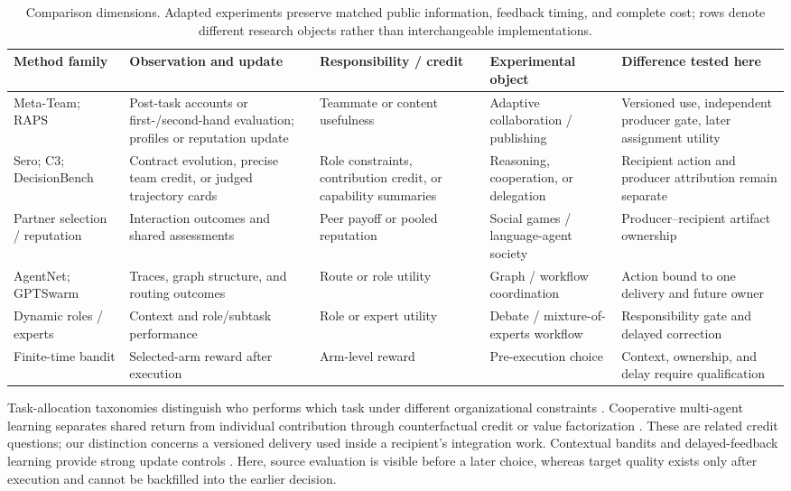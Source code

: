 \documentclass[sigconf,anonymous]{aamas}
\begin{document}
\begin{table}[t]
\centering\small
\setlength{\tabcolsep}{2.7pt}
\begin{tabular}{p{}p{}p{}p{}p{}}
\toprule
Method family & Observation and update & Responsibility / credit & Experimental object & Difference tested here \\
\midrule
Meta-Team; RAPS \cite{hao2026metateam,li2026raps} & Post-task accounts or first-/second-hand evaluation; profiles or reputation update & Teammate or content usefulness & Adaptive collaboration / publishing & Versioned use, independent producer gate, later assignment utility \\
Sero; C3; DecisionBench \cite{ge2026sero,chen2026c3,gao2026decisionbench} & Contract evolution, precise team credit, or judged trajectory cards & Role constraints, contribution credit, or capability summaries & Reasoning, cooperation, or delegation & Recipient action and producer attribution remain separate \\
Partner selection / reputation \cite{leung2025partner,russell2026partner,ren2026reputation} & Interaction outcomes and shared assessments & Peer payoff or pooled reputation & Social games / language-agent society & Producer--recipient artifact ownership \\
AgentNet; GPTSwarm \cite{yang2025agentnet,zhuge2024gptswarm} & Traces, graph structure, and routing outcomes & Route or role utility & Graph / workflow coordination & Action bound to one delivery and future owner \\
Dynamic roles / experts \cite{zhang2026dynamic,li2026morse} & Context and role/subtask performance & Role or expert utility & Debate / mixture-of-experts workflow & Responsibility gate and delayed correction \\
Finite-time bandit \cite{auer2002finite} & Selected-arm reward after execution & Arm-level reward & Pre-execution choice & Context, ownership, and delay require qualification \\
\bottomrule
\end{tabular}
\caption{Comparison dimensions. Adapted experiments preserve matched public information, feedback timing, and complete cost; rows denote different research objects rather than interchangeable implementations.}
\label{tab:positioning}
\end{table}

Task-allocation taxonomies distinguish who performs which task under different organizational constraints \cite{gerkey2004allocation}. Cooperative multi-agent learning separates shared return from individual contribution through counterfactual credit or value factorization \cite{foerster2018coma,rashid2020qmix}. These are related credit questions; our distinction concerns a versioned delivery used inside a recipient's integration work. Contextual bandits and delayed-feedback learning provide strong update controls \cite{li2010contextual,joulani2013delayed}. Here, source evaluation is visible before a later choice, whereas target quality exists only after execution and cannot be backfilled into the earlier decision.
\end{document}
